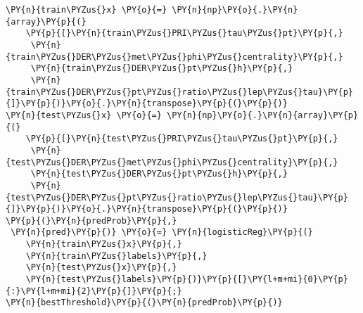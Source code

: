 
{\par%
\vspace{-1\baselineskip}%
}%
\begin{notebookcell}[]%
\begin{addmargin}[\cellleftmargin]{0em}%
{\smaller%
\par%
%
\vspace{-1\smallerfontscale}%
\begin{Verbatim}[commandchars=\\\{\}]
\PY{n}{train\PYZus{}x} \PY{o}{=} \PY{n}{np}\PY{o}{.}\PY{n}{array}\PY{p}{(}
    \PY{p}{[}\PY{n}{train\PYZus{}PRI\PYZus{}tau\PYZus{}pt}\PY{p}{,}
     \PY{n}{train\PYZus{}DER\PYZus{}met\PYZus{}phi\PYZus{}centrality}\PY{p}{,}
     \PY{n}{train\PYZus{}DER\PYZus{}pt\PYZus{}h}\PY{p}{,}
     \PY{n}{train\PYZus{}DER\PYZus{}pt\PYZus{}ratio\PYZus{}lep\PYZus{}tau}\PY{p}{]}\PY{p}{)}\PY{o}{.}\PY{n}{transpose}\PY{p}{(}\PY{p}{)}
\PY{n}{test\PYZus{}x} \PY{o}{=} \PY{n}{np}\PY{o}{.}\PY{n}{array}\PY{p}{(}
    \PY{p}{[}\PY{n}{test\PYZus{}PRI\PYZus{}tau\PYZus{}pt}\PY{p}{,}
     \PY{n}{test\PYZus{}DER\PYZus{}met\PYZus{}phi\PYZus{}centrality}\PY{p}{,}
     \PY{n}{test\PYZus{}DER\PYZus{}pt\PYZus{}h}\PY{p}{,}
     \PY{n}{test\PYZus{}DER\PYZus{}pt\PYZus{}ratio\PYZus{}lep\PYZus{}tau}\PY{p}{]}\PY{p}{)}\PY{o}{.}\PY{n}{transpose}\PY{p}{(}\PY{p}{)}
\PY{p}{(}\PY{n}{predProb}\PY{p}{,}
 \PY{n}{pred}\PY{p}{)} \PY{o}{=} \PY{n}{logisticReg}\PY{p}{(}
    \PY{n}{train\PYZus{}x}\PY{p}{,}
    \PY{n}{train\PYZus{}labels}\PY{p}{,}
    \PY{n}{test\PYZus{}x}\PY{p}{,}
    \PY{n}{test\PYZus{}labels}\PY{p}{)}\PY{p}{[}\PY{l+m+mi}{0}\PY{p}{:}\PY{l+m+mi}{2}\PY{p}{]}\PY{p}{;}
\PY{n}{bestThreshold}\PY{p}{(}\PY{n}{predProb}\PY{p}{)}
\end{Verbatim}
%
\par%
\vspace{-1\smallerfontscale}}%
\end{addmargin}
\end{notebookcell}



